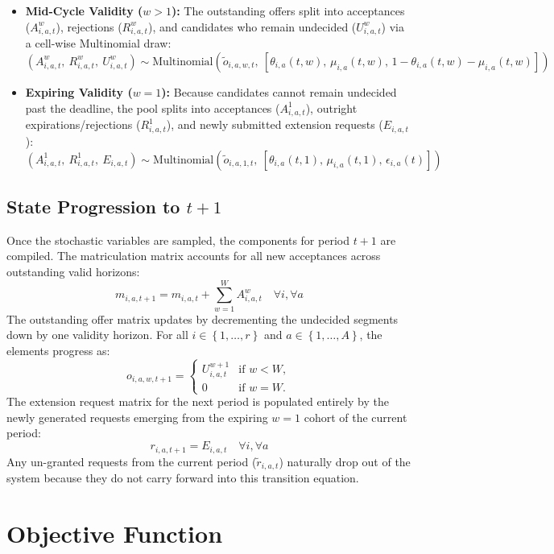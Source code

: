 \documentclass{article}
\newcommand{\Multinomial}{\mathrm{Multinomial}}
\begin{document}
\begin{itemize}
    \item \textbf{Mid-Cycle Validity ($w > 1$):} The outstanding offers split into acceptances ($A_{i, a, t}^w$), rejections ($R_{i, a, t}^w$), and candidates who remain undecided ($U_{i, a, t}^w$) via a cell-wise Multinomial draw:
    \[
    \left(A_{i, a, t}^w,\ R_{i, a, t}^w,\ U_{i, a, t}^w\right) \sim \Multinomial\left(\tilde{o}_{i, a, w, t}, \ [\theta_{i, a}(t, w), \, \mu_{i, a}(t, w), \, 1 - \theta_{i, a}(t, w) - \mu_{i, a}(t, w)]\right)
    \]

    \item \textbf{Expiring Validity ($w = 1$):} Because candidates cannot remain undecided past the deadline, the pool splits into acceptances ($A_{i, a, t}^1$), outright expirations/rejections ($R_{i, a, t}^1$), and newly submitted extension requests ($E_{i, a, t}$):
    \[
    \left(A_{i, a, t}^1,\ R_{i, a, t}^1,\ E_{i, a, t}\right) \sim \Multinomial\left(\tilde{o}_{i, a, 1, t}, \ [\theta_{i, a}(t, 1), \, \mu_{i, a}(t, 1), \, \epsilon_{i, a}(t)]\right)
    \]
\end{itemize}

\subsection{State Progression to $t + 1$}
Once the stochastic variables are sampled, the components for period $t+1$ are compiled. The matriculation matrix accounts for all new acceptances across outstanding valid horizons:
\[
m_{i, a, t+1} = m_{i, a, t} + \sum_{w = 1}^W A_{i, a, t}^w \quad \forall i, \forall a
\]
The outstanding offer matrix updates by decrementing the undecided segments down by one validity horizon. For all $i \in \left\{1, \dots, r\right\}$ and $a \in \left\{1, \dots, A\right\}$, the elements progress as:
\[
o_{i, a, w, t + 1} = \begin{cases}
    U_{i, a, t}^{w + 1} & \text{if } w < W, \\ 
    0 & \text{if } w = W.
\end{cases}
\]
The extension request matrix for the next period is populated entirely by the newly generated requests emerging from the expiring $w=1$ cohort of the current period:
\[
    r_{i, a, t+1} = E_{i, a, t} \quad \forall i, \forall a
    \]
    Any un-granted requests from the current period ($\tilde{r}_{i, a, t}$) naturally drop out of the system because they do not carry forward into this transition equation.

\section{Objective Function}
\end{document}
